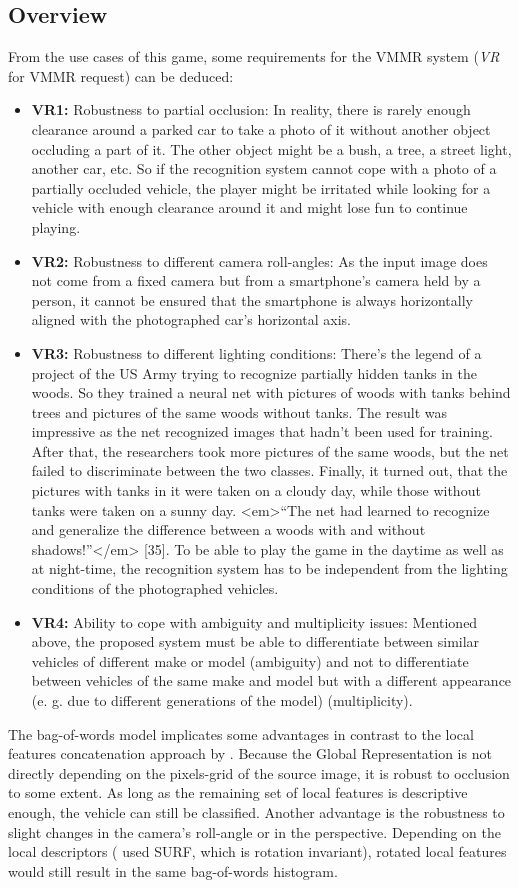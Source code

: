\subsection{Overview}
From the use cases of this game, some requirements for the VMMR system (\emph{VR} for VMMR request) can be deduced:
\begin{itemize}
  \item\textbf{VR1:} Robustness to partial occlusion: In reality, there is rarely enough clearance around a parked car to take a photo of it without another object occluding a part of it. The other object might be a bush, a tree, a street light, another car, etc. So if the recognition system cannot cope with a photo of a partially occluded vehicle, the player might be irritated while looking for a vehicle with enough clearance around it and might lose fun to continue playing.
  \item\textbf{VR2:} Robustness to different camera roll-angles: As the input image does not come from a fixed camera but from a smartphone’s camera held by a person, it cannot be ensured that the smartphone is always horizontally aligned with the photographed car’s horizontal axis.
  \item\textbf{VR3:} Robustness to different lighting conditions: There's the legend of a project of the US Army trying to recognize partially hidden tanks in the woods. So they trained a neural net with pictures of woods with tanks behind trees and pictures of the same woods without tanks. The result was impressive as the net recognized images that hadn't been used for training. After that, the researchers took more pictures of the same woods, but the net failed to discriminate between the two classes. Finally, it turned out, that the pictures with tanks in it were taken on a cloudy day, while those without tanks were taken on a sunny day. <em>“The net had learned to recognize and generalize the difference between a woods with and without shadows!”</em> [35]. To be able to play the game in the daytime as well as at night-time, the recognition system has to be independent from the lighting conditions of the photographed vehicles.
  \item\textbf{VR4:} Ability to cope with ambiguity and multiplicity issues: Mentioned above, the proposed system must be able to differentiate between similar vehicles of different make or model (ambiguity) and not to differentiate between vehicles of the same make and model but with a different appearance (e. g. due to different generations of the model) (multiplicity).
\end{itemize}
The bag-of-words model implicates some advantages in contrast to the local features concatenation approach by \citeauthor{petrovic2004analysis}. Because the Global Representation is not directly depending on the pixels-grid of the source image, it is robust to occlusion to some extent. As long as the remaining set of local features is descriptive enough, the vehicle can still be classified. Another advantage is the robustness to slight changes in the camera's roll-angle or in the perspective. Depending on the local descriptors (\citeauthor{siddiqui2015robust} used SURF, which is rotation invariant), rotated local features would still result in the same bag-of-words histogram.

